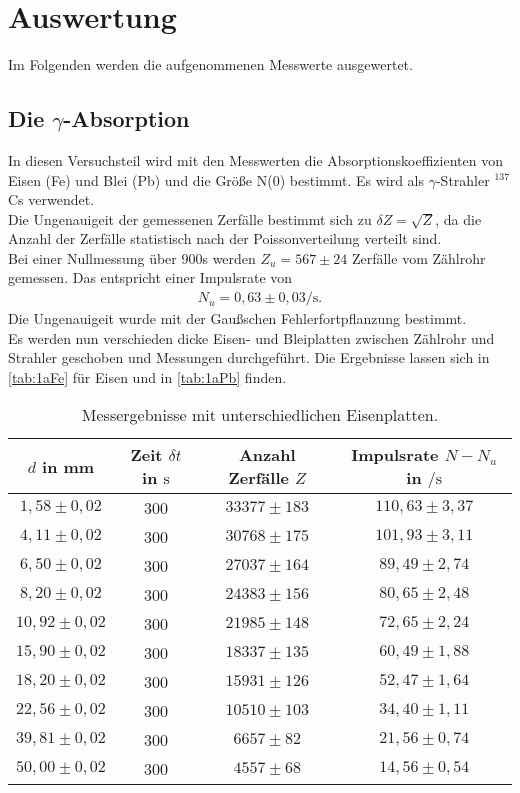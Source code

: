 \section{Auswertung}
\label{sec:Auswertung}

Im Folgenden werden die aufgenommenen Messwerte ausgewertet.

\subsection{Die $γ$-Absorption}

In diesen Versuchsteil wird mit den Messwerten die Absorptionskoeffizienten von Eisen (Fe) und Blei (Pb)
und die Größe N(0) bestimmt. Es wird als $\gamma$-Strahler $^{137}$Cs verwendet.\\
Die Ungenauigeit der gemessenen Zerfälle bestimmt sich zu $\delta Z = \sqrt{Z}$, da die Anzahl der Zerfälle
statistisch nach der Poissonverteilung verteilt sind.\\
Bei einer Nullmessung über 900s werden $Z_u = 567 \pm 24$ Zerfälle vom Zählrohr gemessen. Das entspricht einer
Impulsrate von 
\begin{align*}
  N_u = 0,63 \pm 0,03 \si{\per\second}.
\end{align*}
Die Ungenauigeit wurde mit der Gaußschen Fehlerfortpflanzung bestimmt.\\
Es werden nun verschieden dicke Eisen- und Bleiplatten zwischen Zählrohr und Strahler geschoben und Messungen 
durchgeführt. Die Ergebnisse lassen sich in \autoref{tab:1aFe} für Eisen und in \autoref{tab:1aPb} finden.\\
\begin{table}
  \centering
  \caption{Messergebnisse mit unterschiedlichen Eisenplatten.}
  \label{tab:1aFe}
  \begin{tabular}{c c c c}
    $d$ in \si{\milli\meter} & Zeit $\delta t$ in $\si{\second}$ & Anzahl Zerfälle $Z$  &  Impulsrate $N-N_u$ in $\si{\per\second}$\\
       \midrule
        $1,58 \pm 0,02$   &  300   &  $33377 \pm 183$ & $110,63 \pm 3,37$ \\
        $4,11 \pm 0,02$   &  300   &  $30768 \pm 175$ & $101,93 \pm 3,11$\\
        $6,50 \pm 0,02$   &  300   &  $27037 \pm 164$ & $89,49 \pm 2,74$\\
        $8,20 \pm 0,02$   &  300   &  $24383 \pm 156$ & $80,65 \pm 2,48$\\
        $10,92 \pm 0,02$  &  300   &  $21985 \pm 148$ & $72,65 \pm 2,24$\\
        $15,90 \pm 0,02$  &  300   &  $18337 \pm 135$ & $60,49 \pm 1,88$\\
        $18,20 \pm 0,02$  &  300   &  $15931 \pm 126$ & $52,47 \pm 1,64$\\
        $22,56 \pm 0,02$  &  300   &  $10510 \pm 103$ & $34,40 \pm 1,11$\\
        $39,81 \pm 0,02$  &  300   &  $ 6657 \pm 82$ & $21,56 \pm 0,74$\\
        $50,00 \pm 0,02$  &  300   &  $ 4557 \pm 68$ & $14,56 \pm 0,54$\\
      \bottomrule
    \end{tabular}
\end{table}

